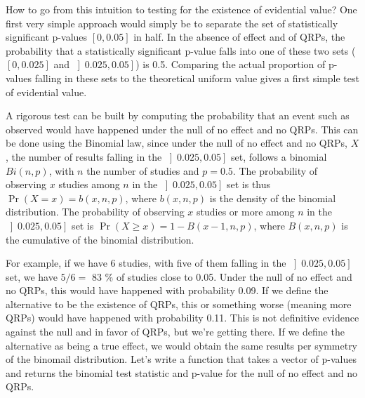 \documentclass[]{book}
\theoremstyle{definition}
\theoremstyle{definition}
\theoremstyle{definition}
\theoremstyle{remark}
\begin{document}
How to go from this intuition to testing for the existence of evidential value?
One first very simple approach would simply be to separate the set of statistically significant p-values \(\left[0,0.05\right]\) in half.
In the absence of effect and of QRPs, the probability that a statistically significant p-value falls into one of these two sets (\(\left[0,0.025\right]\) and \(\left]0.025,0.05\right]\)) is 0.5.
Comparing the actual proportion of p-values falling in these sets to the theoretical uniform value gives a first simple test of evidential value.

A rigorous test can be built by computing the probability that an event such as observed would have happened under the null of no effect and no QRPs.
This can be done using the Binomial law, since under the null of no effect and no QRPs, \(X\), the number of results falling in the \(\left]0.025,0.05\right]\) set, follows a binomial \(Bi(n,p)\), with \(n\) the number of studies and \(p=0.5\).
The probability of observing \(x\) studies among \(n\) in the \(\left]0.025,0.05\right]\) set is thus \(\Pr(X=x)=b(x,n,p)\), where \(b(x,n,p)\) is the density of the binomial distribution.
The probability of observing \(x\) studies or more among \(n\) in the \(\left]0.025,0.05\right]\) set is \(\Pr(X\geq x)=1-B(x-1,n,p)\), where \(B(x,n,p)\) is the cumulative of the binomial distribution.

For example, if we have 6 studies, with five of them falling in the \(\left]0.025,0.05\right]\) set, we have \(5/6=\) 83 \% of studies close to 0.05.
Under the null of no effect and no QRPs, this would have happened with probability 0.09.
If we define the alternative to be the existence of QRPs, this or something worse (meaning more QRPs) would have happened with probability 0.11.
This is not definitive evidence against the null and in favor of QRPs, but we're getting there.
If we define the alternative as being a true effect, we would obtain the same results per symmetry of the binomail distribution.
Let's write a function that takes a vector of p-values and returns the binomial test statistic and p-value for the null of no effect and no QRPs.
\end{document}

